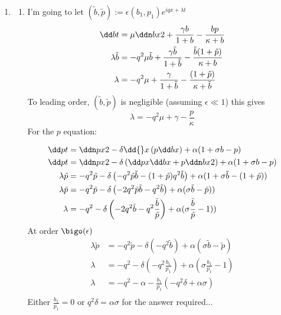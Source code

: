 \documentclass{X:/Documents/Coding/Latex/myassignment}
\begin{document}
\begin{enumerate}
	\item 
	\begin{enumerate}
		\item I'm going to let $(\tilde{b}, \tilde{p}) := \epsilon(b_1,p_1)e^{iqx+\lambda t}$ 
		\begin{align*}
			\dd bt &= \mu \ddn bx2 + \frac{\gamma b}{1+ b} - \frac{b p }{\kappa + b}\\
			\lambda \tilde{b} &= -q^2 \mu \tilde{b} + \frac{\gamma \tilde{b}}{1 + \tilde{b}} - \frac{\tilde{b} (1 + \tilde{p})}{\kappa + b}\\
			\lambda &= -q^2 \mu + \frac{\gamma}{1 + \tilde{b}} - \frac{(1+\tilde{p})}{\kappa + \tilde{b}}\\
		\end{align*}
		To leading order, $(\tilde{b},\tilde{p})$ is negligible (assuming $\epsilon \ll 1$) this gives
		\[\lambda = -q^2 \mu + \gamma - \frac{p}{\kappa}\]
		For the $p$ equation:

		\begin{align*}
			\dd pt &= \ddn px2 - \delta \dd{}x \left(p \dd bx\right) + \alpha (1 + \sigma b -p)\\
			\dd pt &= \ddn px2 - \delta \left(\dd px \dd bx + p \ddn bx2\right) + \alpha (1 + \sigma b -p)\\
			\lambda \tilde{p} &= -q^2 \tilde{p} - \delta\left(-q ^2\tilde p \tilde b - (1+ \tilde{p})q^2 \tilde{b}\right)+ \alpha (1 + \sigma \tilde{b} - (1 + \tilde{p}))\\
			\lambda \tilde{p} &= -q^2 \tilde{p} - \delta\left(-2q ^2\tilde p \tilde b - q^2 \tilde{b}\right)+ \alpha (\sigma \tilde{b} - \tilde{p}))\\
			\lambda  &= -q^2 - \delta\left(-2q ^2 \tilde b - q^2 \frac{\tilde{b}}{\tilde{p}}\right)+ \alpha (\sigma \frac{\tilde{b}}{\tilde{p}} - 1))\\
		\end{align*}
		At order $\bigo(\epsilon)$
		\begin{align*}
			\lambda \tilde{p} &= -q^2 \tilde{p} - \delta\left(-q^2 \tilde{b}\right)+ \alpha (\sigma \tilde{b} - \tilde{p})\\
			\lambda &= -q^2 - \delta\left(-q^2 \frac{b_1}{p_1}\right)+ \alpha (\sigma \frac{b_1}{p_1} - 1)\\
			\lambda &= -q^2  - \alpha - \frac{b_1}{p_1}\left( -q^2 \delta+ \alpha \sigma \right)\\
		\end{align*}
		Either $\frac{b_1}{p_1} = 0$ or $q^2 \delta = \alpha \sigma $ for the answer required...


\end{enumerate}
\end{enumerate}
\end{document}
